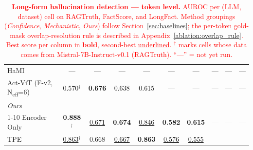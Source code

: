 \begin{table}[!b]
{\begin{tabular}{l ccc ccc ccc}
HaMI                             & --- & --- & --- & --- & --- & --- & --- & --- & --- \\
Act-ViT (F-v2, N\textsubscript{eff}=6)
                                 & 0.570$^{\dagger}$ & \textbf{0.676} & 0.638 & 0.615 & --- & --- & --- & --- & --- \\
\midrule
\multicolumn{10}{l}{\textit{Ours}} \\
\cmidrule(l){1-10}
Encoder Only               & \textbf{0.888}$^{\dagger}$ & \underline{0.671} & \textbf{0.674} & \underline{0.846} & \textbf{0.582} & \textbf{0.615} & --- & --- & --- \\
TPE                   & \underline{0.863}$^{\dagger}$ & 0.668 & \underline{0.667} & \textbf{0.863} & \underline{0.576} & \underline{0.555} & --- & --- & --- \\
\bottomrule
\end{tabular}%
}
\caption{\textcolor{red}{\textbf{Long-form hallucination detection --- token level.}
AUROC per (LLM, dataset) cell on RAGTruth, FactScore, and LongFact.
Method
groupings (\emph{Confidence}, \emph{Mechanistic}, \emph{Ours}) follow
Section~\ref{sec:baselines}; the per-token gold-mask
overlap-resolution rule is described in
Appendix~\ref{ablation:overlap_rule}. Best score per column in
\textbf{bold}, second-best \underline{underlined}. $^\dagger$ marks
cells whose data comes from Mistral-7B-Instruct-v0.1 (RAGTruth).
``---'' = not yet run.}}
\label{tab:token_level}
\end{table}
